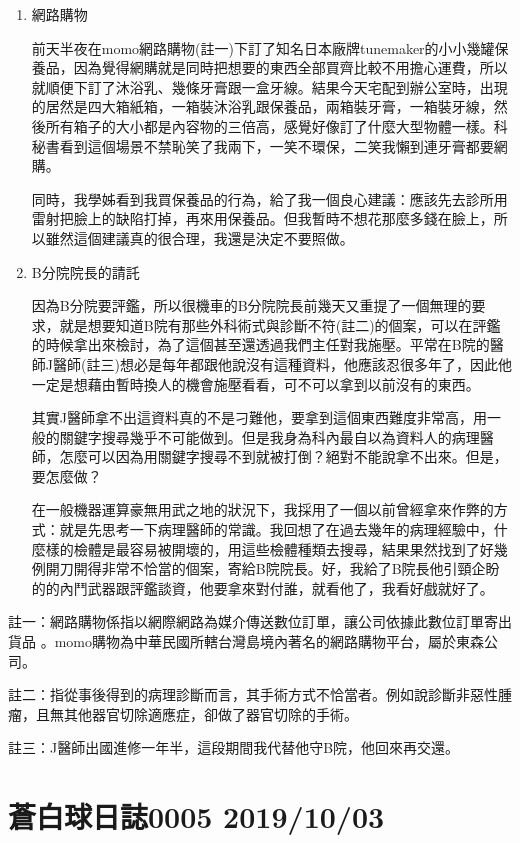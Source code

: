 \documentclass[
]{article}
\begin{document}
\begin{enumerate}
\def\labelenumi{\arabic{enumi}.}
\item
  網路購物

  前天半夜在momo網路購物(註一)下訂了知名日本廠牌tunemaker的小小幾罐保養品，因為覺得網購就是同時把想要的東西全部買齊比較不用擔心運費，所以就順便下訂了沐浴乳、幾條牙膏跟一盒牙線。結果今天宅配到辦公室時，出現的居然是四大箱紙箱，一箱裝沐浴乳跟保養品，兩箱裝牙膏，一箱裝牙線，然後所有箱子的大小都是內容物的三倍高，感覺好像訂了什麼大型物體一樣。科秘書看到這個場景不禁恥笑了我兩下，一笑不環保，二笑我懶到連牙膏都要網購。

  同時，我學姊看到我買保養品的行為，給了我一個良心建議：應該先去診所用雷射把臉上的缺陷打掉，再來用保養品。但我暫時不想花那麼多錢在臉上，所以雖然這個建議真的很合理，我還是決定不要照做。
\item
  B分院院長的請託

  因為B分院要評鑑，所以很機車的B分院院長前幾天又重提了一個無理的要求，就是想要知道B院有那些外科術式與診斷不符(註二)的個案，可以在評鑑的時候拿出來檢討，為了這個甚至還透過我們主任對我施壓。平常在B院的醫師J醫師(註三)想必是每年都跟他說沒有這種資料，他應該忍很多年了，因此他一定是想藉由暫時換人的機會施壓看看，可不可以拿到以前沒有的東西。

  其實J醫師拿不出這資料真的不是刁難他，要拿到這個東西難度非常高，用一般的關鍵字搜尋幾乎不可能做到。但是我身為科內最自以為資料人的病理醫師，怎麼可以因為用關鍵字搜尋不到就被打倒？絕對不能說拿不出來。但是，要怎麼做？

  在一般機器運算豪無用武之地的狀況下，我採用了一個以前曾經拿來作弊的方式：就是先思考一下病理醫師的常識。我回想了在過去幾年的病理經驗中，什麼樣的檢體是最容易被開壞的，用這些檢體種類去搜尋，結果果然找到了好幾例開刀開得非常不恰當的個案，寄給B院院長。好，我給了B院長他引頸企盼的的內鬥武器跟評鑑談資，他要拿來對付誰，就看他了，我看好戲就好了。
\end{enumerate}

註一：網路購物係指以網際網路為媒介傳送數位訂單，讓公司依據此數位訂單寄出貨品
。momo購物為中華民國所轄台灣島境內著名的網路購物平台，屬於東森公司。

註二：指從事後得到的病理診斷而言，其手術方式不恰當者。例如說診斷非惡性腫瘤，且無其他器官切除適應症，卻做了器官切除的手術。

註三：J醫師出國進修一年半，這段期間我代替他守B院，他回來再交還。

\hypertarget{ux84bcux767dux7403ux65e5ux8a8c0005-20191003}{%
\section{蒼白球日誌0005
2019/10/03}\label{ux84bcux767dux7403ux65e5ux8a8c0005-20191003}}
\end{document}
